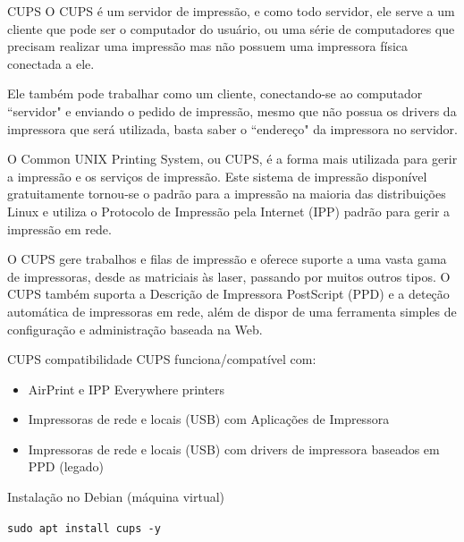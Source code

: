 \documentclass{if-beamer}
\begin{document}
\begin{frame}[allowframebreaks]{CUPS}
    O CUPS é um servidor de impressão, e como todo servidor, ele serve a um cliente que pode ser o computador do usuário, ou uma série de computadores 
    que precisam realizar uma impressão mas não possuem uma impressora física conectada a ele.

    Ele também pode trabalhar como um cliente, conectando-se ao computador ``servidor" e enviando o pedido de impressão, mesmo que não possua 
    os drivers da impressora que será utilizada, basta saber o ``endereço" da impressora no servidor.

    \framebreak

    O Common UNIX Printing System, ou CUPS, é a forma mais utilizada para gerir a impressão e os serviços de impressão. Este sistema de impressão disponível gratuitamente
    tornou-se o padrão para a impressão na maioria das distribuições Linux e utiliza o Protocolo de Impressão pela Internet (IPP) padrão
    para gerir a impressão em rede.

    O CUPS gere trabalhos e filas de impressão e oferece suporte a uma vasta gama de impressoras, desde as matriciais às laser, passando por muitos outros tipos.
    O CUPS também suporta a Descrição de Impressora PostScript (PPD) e a deteção automática de impressoras em rede, além de dispor de uma ferramenta simples de configuração
    e administração baseada na Web.
\end{frame}

\begin{frame}{CUPS compatibilidade}
    CUPS funciona/compatível com:
    \begin{itemize}
        \item AirPrint\texttrademark{} e IPP Everywhere\texttrademark{} printers
        \item Impressoras de rede e locais (USB) com Aplicações de Impressora
        \item Impressoras de rede e locais (USB) com drivers de impressora baseados em PPD (legado)
    \end{itemize}
\end{frame}

\begin{frame}{Instalação no Debian (máquina virtual)}
    \begin{center}
        \texttt{sudo apt install cups -y}
    \end{center}
\end{frame}
\end{document}
